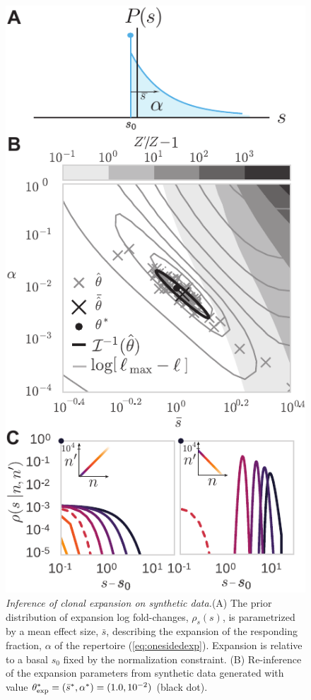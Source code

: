 \documentclass[pre,twocolumn,english,longbibliography]{revtex4}
\newcommand{\<}{\langle}
\renewcommand{\>}{\rangle}
\begin{document}
\begin{figure}
\includegraphics{fig5_diffexpr_eval}
\centering{}
\caption{
\emph{Inference of clonal expansion on synthetic data.}(A) The prior distribution of expansion log fold-changes, $\rho_s(s)$, is parametrized by a mean effect size, $\bar{s}$, describing the expansion of the responding fraction, $\alpha$ of the repertoire  (\cref{eq:onesidedexp}). 
Expansion is relative to a basal $s_0$ fixed by the normalization constraint.
(B) Re-inference of the expansion parameters from synthetic data generated with value $\theta_{\rm exp}^*=(\bar{s}^*,\alpha^* )=(1.0,10^{-2})$ (black dot). 
}
\end{figure}
\end{document}

